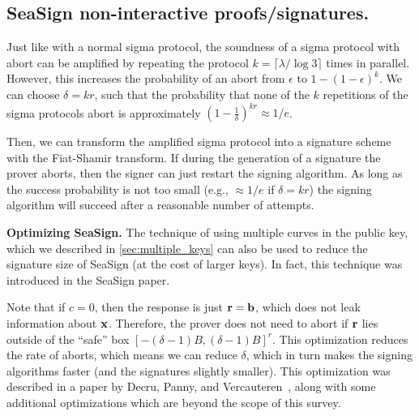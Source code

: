 \subsection{SeaSign non-interactive proofs/signatures.}

Just like with a normal sigma protocol, the soundness of a sigma protocol with abort can be amplified by repeating the protocol $k = \lceil \lambda / \log 3 \rceil$ times in parallel. However, this increases the probability of an abort from $\epsilon$ to $1-(1-\epsilon)^k$. We can choose $\delta = kr$, such that the probability that none of the $k$ repetitions of the sigma protocols abort is approximately $(1-\frac{1}{\delta})^{kr} \approx 1/e$.

Then, we can transform the amplified sigma protocol into a signature scheme with the Fiat-Shamir transform. If during the generation of a signature the prover aborts, then the signer can just restart the signing algorithm. As long as the success probability is not too small (e.g., $\approx 1/e$ if $\delta = kr$) the signing algorithm will succeed after a reasonable number of attempts.

{\bf Optimizing SeaSign.} The technique of using multiple curves in the public key, which we described in \cref{sec:multiple_keys} can also be used to reduce the signature size of SeaSign (at the cost of larger keys). In fact, this technique was introduced in the SeaSign paper.

Note that if $c=0$, then the response is just $\mathbf{r} = \mathbf{b}$, which does not leak information about $\mathbf{x}$. Therefore, the prover does not need to abort if $\mathbf{r}$ lies outside of the ``safe'' box $[-(\delta-1)B,(\delta-1)B]^r$. This optimization reduces the rate of aborts, which means we can reduce $\delta$, which in turn makes the signing algorithms faster (and the signatures slightly smaller). This optimization was described in a paper by Decru, Panny, and Vercauteren~\cite{FasterSeaSign}, along with some additional optimizations which are beyond the scope of this survey.